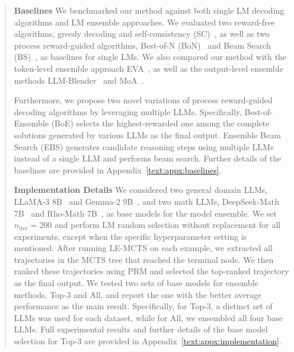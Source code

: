 \documentclass[11pt]{article}
\begin{document}
\begin{abstract}
\medskip
\par \noindent \textbf{Baselines} \; 
We benchmarked our method against both single LM decoding algorithms and LM ensemble approaches. 
We evaluated two reward-free algorithms, greedy decoding and self-consistency (SC)~\citep{wang-etal-2023-selfconsistency}, as well as two process reward-guided algorithms, Best-of-N (BoN)~\citep{lightman-etal-2023-prm800k} and Beam Search (BS)~\citep{yu-etal-2024-ovm}, as baselines for single LMs.
We also compared our method with the token-level ensemble approach EVA~\citep{xu-etal-2024-bridging}, as well as the output-level ensemble methods LLM-Blender~\citep{jiang-etal-2023-llm} and MoA~\citep{wang-etal-2024-mixture}.

Furthermore, we propose two novel variations of process reward-guided decoding algorithms by leveraging multiple LLMs. 
Specifically, Best-of-Ensemble (BoE) selects the highest-rewarded one among the complete solutions generated by various LLMs as the final output.
Ensemble Beam Search (EBS) generates candidate reasoning steps using multiple LLMs instead of a single LLM and performs beam search.
Further details of the baselines are provided in Appendix~\ref{text:appx:baselines}.
\medskip
\par \noindent \textbf{Implementation Details} \; We considered two general domain LLMs, LLaMA-3 8B~\citep{dubey-etal-2024-llama3} and Gemma-2 9B~\citep{gemma-etal-2024-gemma2}, and two math LLMs, DeepSeek-Math 7B~\citep{shao-etal-2024-deepseek} and Rho-Math 7B~\citep{lin-etal-2024-rho}, as base models for the model ensemble. 
We set \( n_{\text{iter}}=200 \) and perform LM random selection without replacement for all experiments, except when the specific hyperparameter setting is mentioned.
After running LE-MCTS on each example, we extracted all trajectories in the MCTS tree that reached the terminal node. 
We then ranked these trajectories using PRM and selected the top-ranked trajectory as the final output. 
We tested two sets of base models for ensemble methods, Top-3 and All, and report the one with the better average performance as the main result. 
Specifically, for Top-3, a distinct set of LLMs was used for each dataset, while for All, we ensembled all four base LLMs. 
Full experimental results and further details of the base model selection for Top-3 are provided in Appendix~\ref{text:appx:implementation}.


\end{abstract}
\end{document}
